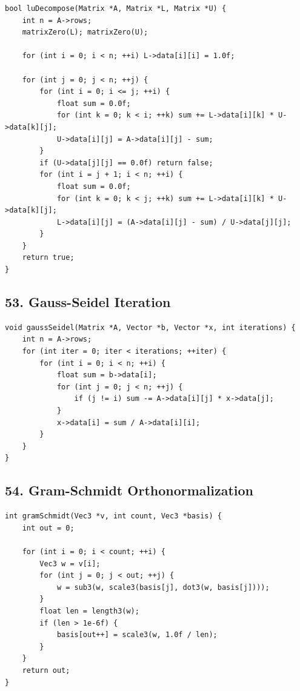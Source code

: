 \documentclass[10pt,letterpaper]{article}
\begin{document}
\begin{verbatim}
bool luDecompose(Matrix *A, Matrix *L, Matrix *U) {
    int n = A->rows;
    matrixZero(L); matrixZero(U);

    for (int i = 0; i < n; ++i) L->data[i][i] = 1.0f;

    for (int j = 0; j < n; ++j) {
        for (int i = 0; i <= j; ++i) {
            float sum = 0.0f;
            for (int k = 0; k < i; ++k) sum += L->data[i][k] * U->data[k][j];
            U->data[i][j] = A->data[i][j] - sum;
        }
        if (U->data[j][j] == 0.0f) return false;
        for (int i = j + 1; i < n; ++i) {
            float sum = 0.0f;
            for (int k = 0; k < j; ++k) sum += L->data[i][k] * U->data[k][j];
            L->data[i][j] = (A->data[i][j] - sum) / U->data[j][j];
        }
    }
    return true;
}
\end{verbatim}

\subsection*{53. Gauss-Seidel Iteration}

\begin{verbatim}
void gaussSeidel(Matrix *A, Vector *b, Vector *x, int iterations) {
    int n = A->rows;
    for (int iter = 0; iter < iterations; ++iter) {
        for (int i = 0; i < n; ++i) {
            float sum = b->data[i];
            for (int j = 0; j < n; ++j) {
                if (j != i) sum -= A->data[i][j] * x->data[j];
            }
            x->data[i] = sum / A->data[i][i];
        }
    }
}
\end{verbatim}

\subsection*{54. Gram-Schmidt Orthonormalization}

\begin{verbatim}
int gramSchmidt(Vec3 *v, int count, Vec3 *basis) {
    int out = 0;

    for (int i = 0; i < count; ++i) {
        Vec3 w = v[i];
        for (int j = 0; j < out; ++j) {
            w = sub3(w, scale3(basis[j], dot3(w, basis[j])));
        }
        float len = length3(w);
        if (len > 1e-6f) {
            basis[out++] = scale3(w, 1.0f / len);
        }
    }
    return out;
}
\end{verbatim}
\end{document}

